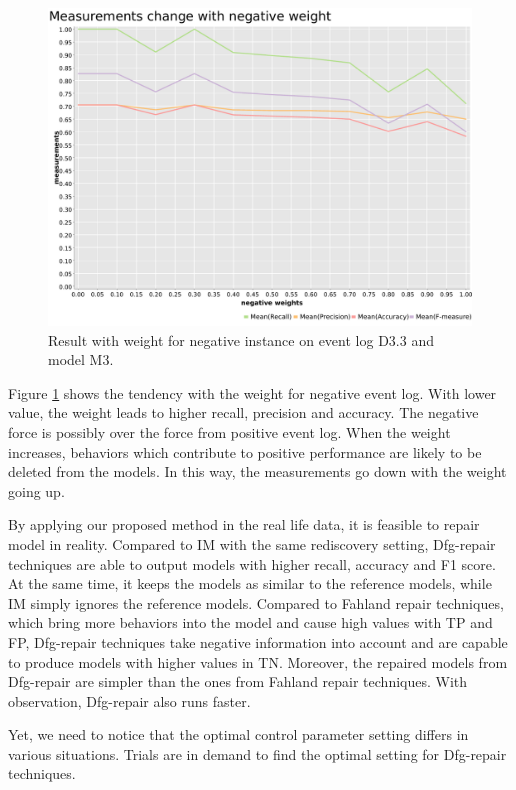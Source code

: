 \begin{figure}[htb]
	\includegraphics[width=\linewidth]{figures/evaluation/M3-D43-neg-weight-plot.pdf}
	\caption[Result tendency with weight for negative instances]{Result with weight for negative instance on event log D3.3 and model M3.}
	\label{fig:neg-weight}
\end{figure}
Figure \ref{fig:neg-weight} shows the tendency with the weight  for negative event log. With lower value, the weight leads to higher recall, precision and accuracy. The negative force is possibly over the force from positive event log. When the weight increases, behaviors which contribute to positive performance are likely to be deleted from the models. In this way, the measurements go down with the weight going up.

By applying our proposed method in the real life data, it is feasible to repair model in reality.   Compared to IM with the same rediscovery setting, Dfg-repair techniques are able to output models with higher recall, accuracy and F1 score. At the same time, it keeps the models as similar to the reference models, while IM simply ignores the reference models. Compared to Fahland repair techniques, which bring more behaviors into the model and cause high values with TP and FP, Dfg-repair techniques take negative information into account and are capable to produce models with higher values in TN. Moreover, the repaired models from Dfg-repair are simpler than the ones from Fahland repair techniques.  With observation, Dfg-repair also runs faster.  

Yet, we need to notice that the optimal control parameter setting differs in various situations. Trials are in demand to find the optimal setting for Dfg-repair techniques. 

